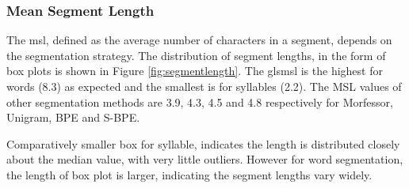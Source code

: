 \subsubsection{Mean Segment Length}

The \gls{msl}, defined as the average number of characters in a segment, depends on
the segmentation strategy. The distribution of segment lengths, in the form of
box plots is shown in Figure \ref{fig:segmentlength}. The gls{msl} is the highest for
words (8.3) as expected and the smallest is for syllables (2.2). The MSL values
of other segmentation methods are 3.9, 4.3, 4.5 and 4.8 respectively for
Morfessor, Unigram, BPE and S-BPE.

Comparatively smaller box for syllable, indicates the length is distributed
closely about the median value, with very little outliers. However for word
segmentation, the length of box plot is larger, indicating the segment lengths
vary widely.





